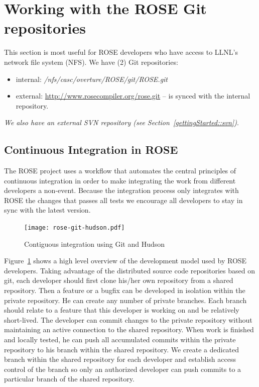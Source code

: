 	\section{Working with the ROSE Git repositories}

%
This section is most useful for ROSE developers who have access to LLNL's network file
system (NFS).
\newline\newline
We have (2) Git repositories:
\begin{itemize}
	\item internal: \textit{/nfs/casc/overture/ROSE/git/ROSE.git}
	\item external: \url{http://www.rosecompiler.org/rose.git} -- is synced with the internal repository.
\end{itemize}

\textit{We also have an external SVN repository (see Section~\ref{gettingStarted::svn})}.
	\subsection{Continuous Integration in ROSE}
The ROSE project uses a workflow that automates the central principles of
continuous integration in order to make integrating the work from different
developers a non-event. Because the integration process only integrates
with ROSE the changes that passes all tests we encourage all developers
to stay in sync with the latest version.

\begin{figure}[htbp]  
  \centering
    \texttt{[image: rose-git-hudson.pdf]}
  \caption{Contiguous integration using Git and Hudson}
  \label{fig:rose-git-hudson}
\end{figure}

Figure~\ref{fig:rose-git-hudson} shows a high level overview of the development model used by 
ROSE developers. Taking advantage of the distributed source code repositories based on git, 
each developer should first clone his/her own repository from a shared repository.
Then a feature or a bugfix can be developed in isolation within the private repository.
He can create any number of private branches. Each branch should relate to a
feature that this developer is working on and be relatively short-lived. 
The developer can commit changes to the private repository without
maintaining an active connection to 
the shared repository.  When work is finished and locally tested, he can push all accumulated commits within the private repository 
to his branch within the shared repository. 
We create a dedicated branch within the shared repository for each developer and establish access control of the
branch so only an authorized developer can push commits to a particular branch of the shared repository. 

